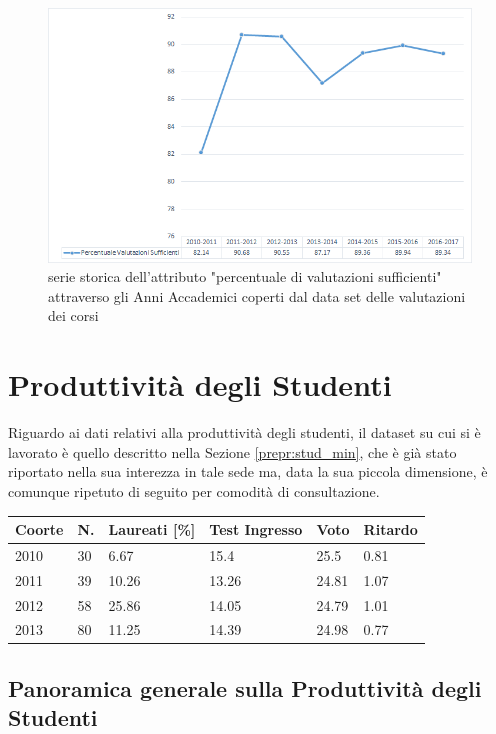     \begin{figure}
        \centering
        \caption{serie storica dell'attributo "percentuale di valutazioni sufficienti" attraverso gli Anni Accademici coperti dal data set delle valutazioni dei corsi}
        \label{eval_p}
        \includegraphics[scale=0.56]{../visual/eval_2.png}
    \end{figure}

\section{Produttività degli Studenti}

    Riguardo ai dati relativi alla produttività degli studenti, il dataset su cui si è lavorato è quello descritto nella Sezione \ref{prepr:stud_min}, che è già stato riportato nella sua interezza in tale sede ma, data la sua piccola dimensione, è comunque ripetuto di seguito per comodità di consultazione. \\

    \begin{tabular}{llllll}
		\hline
		Coorte & N. & Laureati {[}\%{]} & Test Ingresso & Voto & Ritardo \\ \hline
		2010 & 30 & 6.67 & 15.4 & 25.5 & 0.81 \\
		2011 & 39 & 10.26 & 13.26 & 24.81 & 1.07 \\
		2012 & 58 & 25.86 & 14.05 & 24.79 & 1.01 \\
		2013 & 80 & 11.25 & 14.39 & 24.98 & 0.77 \\ \hline
	\end{tabular}

    \subsection{Panoramica generale sulla Produttività degli Studenti}

